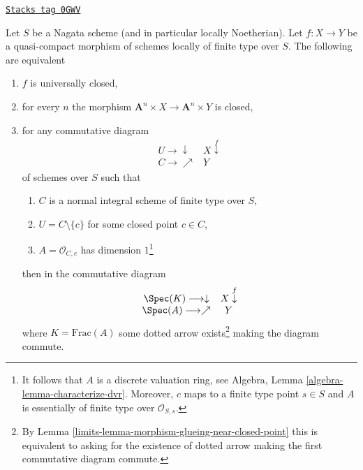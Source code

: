 \begin{lemma}
\label{limits-lemma-essentially-finite-type-criterion-universally-closed}
\href{https://stacks.math.columbia.edu/tag/0GWV}{\texttt{Stacks tag 0GWV}}

Let $S$ be a Nagata scheme (and in particular locally Noetherian).
Let $f : X \to Y$ be a quasi-compact morphism of schemes locally
of finite type over $S$. The following are equivalent
\begin{enumerate}
\item $f$ is universally closed,
\item for every $n$ the morphism
$\mathbf{A}^n \times X \to \mathbf{A}^n \times Y$ is closed,
\item for any commutative diagram
$$
\begin{array}{cc}U \longrightarrow\downarrow & X \overset{f}{\downarrow} \\ C \longrightarrow\nearrow & Y\end{array}
$$
of schemes over $S$ such that
\begin{enumerate}
\item $C$ is a normal integral scheme of finite type over $S$,
\item $U = C \setminus \{c\}$ for some closed point $c \in C$,
\item $A = \mathcal{O}_{C, c}$ has dimension $1$\footnote{It follows
that $A$ is a discrete valuation ring, see
Algebra, Lemma \ref{algebra-lemma-characterize-dvr}.
Moreover, $c$ maps to a finite type point $s \in S$ and
$A$ is essentially of finite type over $\mathcal{O}_{S, s}$.}
\end{enumerate}
then in the commutative diagram
$$
\begin{array}{cc}\Spec(K) \longrightarrow\downarrow & X \overset{f}{\downarrow} \\ \Spec(A) \longrightarrow\nearrow & Y\end{array}
$$
where $K = \text{Frac}(A)$ some dotted arrow exists\footnote{By
Lemma \ref{limits-lemma-morphism-glueing-near-closed-point} this is
equivalent to asking for the existence of dotted arrow
making the first commutative diagram commute.}
making the diagram commute.
\end{enumerate}
\end{lemma}

